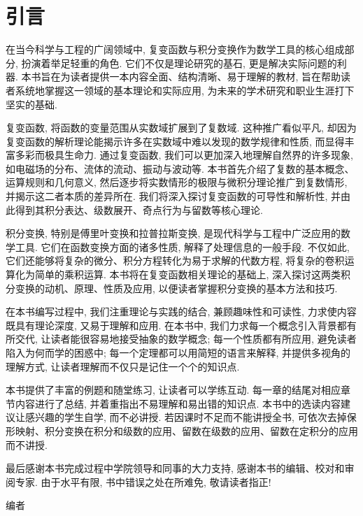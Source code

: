 
\chapter{引言}

在当今科学与工程的广阔领域中, 复变函数与积分变换作为数学工具的核心组成部分, 扮演着举足轻重的角色.
它们不仅是理论研究的基石, 更是解决实际问题的利器.
本书旨在为读者提供一本内容全面、结构清晰、易于理解的教材, 旨在帮助读者系统地掌握这一领域的基本理论和实际应用, 为未来的学术研究和职业生涯打下坚实的基础. 

复变函数, 将函数的变量范围从实数域扩展到了复数域.
这种推广看似平凡, 却因为复变函数的解析理论能揭示许多在实数域中难以发现的数学规律和性质, 而显得丰富多彩而极具生命力.
通过复变函数, 我们可以更加深入地理解自然界的许多现象, 如电磁场的分布、流体的流动、振动与波动等.
本书首先介绍了复数的基本概念、运算规则和几何意义, 然后逐步将实数情形的极限与微积分理论推广到复数情形, 并揭示这二者本质的差异所在.
我们将深入探讨复变函数的可导性和解析性, 并由此得到其积分表达、级数展开、奇点行为与留数等核心理论. 

积分变换, 特别是傅里叶变换和拉普拉斯变换, 是现代科学与工程中广泛应用的数学工具.
它们在函数变换方面的诸多性质, 解释了处理信息的一般手段.
不仅如此, 它们还能够将复杂的微分、积分方程转化为易于求解的代数方程, 将复杂的卷积运算化为简单的乘积运算.
本书将在复变函数相关理论的基础上, 深入探讨这两类积分变换的动机、原理、性质及应用, 以便读者掌握积分变换的基本方法和技巧.

在本书编写过程中, 我们注重理论与实践的结合, 兼顾趣味性和可读性, 力求使内容既具有理论深度, 又易于理解和应用.
在本书中, 我们力求每一个概念引入背景都有所交代, 让读者能很容易地接受抽象的数学概念;
每一个性质都有所应用, 避免读者陷入为何而学的困惑中;
每一个定理都可以用简短的语言来解释, 并提供多视角的理解方式, 让读者理解而不仅只是记住一个个的知识点.

本书提供了丰富的例题和随堂练习, 让读者可以学练互动.
每一章的结尾对相应章节内容进行了总结, 并着重指出不易理解和易出错的知识点. 
本书中的选读内容建议让感兴趣的学生自学, 而不必讲授.
若因课时不足而不能讲授全书, 可依次去掉保形映射、积分变换在积分和级数的应用、留数在级数的应用、留数在定积分的应用而不讲授.

最后感谢本书完成过程中学院领导和同事的大力支持, 感谢本书的编辑、校对和审阅专家.
由于水平有限, 书中错误之处在所难免, 敬请读者指正!

\vskip 0.5cm
\begin{flushright}
编者

\zhtoday
\end{flushright}
